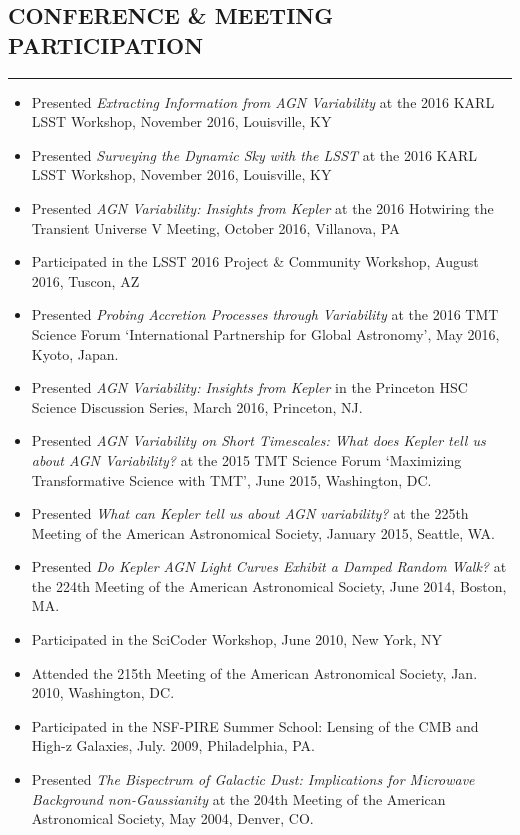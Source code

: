 \documentclass[10pt,a4]{article}
\newcounter{mySaveCounter}
\newcommand\myEnumReset{\setcounter{mySaveCounter}{0}}
\begin{document}
\subsection*{CONFERENCE \& MEETING PARTICIPATION}
\hrule  height 4pt
\vspace{0.2cm}
\begin{itemize}
    \item Presented {\it Extracting Information from AGN Variability} at the 2016 KARL LSST Workshop, November 2016, Louisville, KY
    \item Presented {\it Surveying the Dynamic Sky with the LSST} at the 2016 KARL LSST Workshop, November 2016, Louisville, KY
    \item Presented {\it AGN Variability: Insights from Kepler} at the 2016 Hotwiring the Transient Universe V Meeting, October 2016, Villanova, PA
    \item Participated in the LSST 2016 Project \& Community Workshop, August 2016, Tuscon, AZ
    \item Presented {\it Probing Accretion Processes through Variability} at the 2016 TMT Science Forum `International Partnership for Global Astronomy', May 2016, Kyoto, Japan.
    \item Presented {\it AGN Variability: Insights from Kepler} in the Princeton HSC Science Discussion Series, March 2016, Princeton, NJ.
    \item Presented {\it AGN Variability on Short Timescales: What does Kepler tell us about AGN Variability?} at the 2015 TMT Science Forum `Maximizing Transformative Science with TMT', June 2015, Washington, DC.
    \item Presented {\it What can Kepler tell us about AGN variability?} at the 225th Meeting of the American Astronomical Society, January 2015, Seattle, WA.
    \item Presented {\it Do Kepler AGN Light Curves Exhibit a Damped Random Walk?} at the 224th Meeting of the American Astronomical Society, June 2014, Boston, MA.
    \item Participated in the SciCoder Workshop, June 2010, New York, NY
    \item Attended the 215th Meeting of the American Astronomical Society, Jan. 2010, Washington, DC.
    \item Participated in the NSF-PIRE Summer School: Lensing of the CMB and High-z Galaxies, July. 2009, Philadelphia, PA.
    \item  Presented {\it The Bispectrum of Galactic Dust: Implications for Microwave Background non-Gaussianity} at the 204th Meeting of the American Astronomical Society, May 2004, Denver, CO.
\end{itemize}
\myEnumReset
\end{document}

